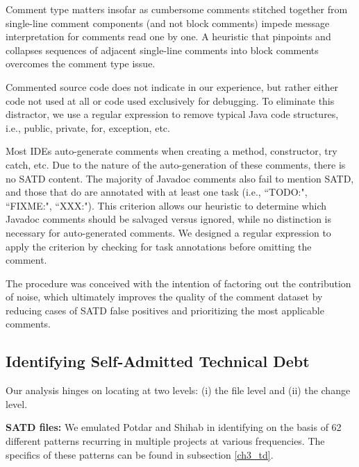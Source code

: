 Comment type matters insofar as cumbersome comments stitched together from single-line comment components (and not block comments) impede message interpretation for comments read one by one. A heuristic that pinpoints and collapses sequences of adjacent single-line comments into block comments overcomes the comment type issue.\par



Commented source code does not indicate \SATD in our experience, but rather either code not used at all or code used exclusively for debugging. To eliminate this distractor, we use a regular expression to remove typical Java code structures, i.e., public, private, for, exception, etc.\par


Most IDEs auto-generate comments when creating a method, constructor, try catch, etc. Due to the nature of the auto-generation of these comments, there is no SATD content. The majority of Javadoc comments also fail to mention SATD, and those that do are annotated with at least one task (i.e., ``TODO:", ``FIXME:", ``XXX:"). This criterion allows our heuristic to determine which Javadoc comments should be salvaged versus ignored, while no distinction is necessary for auto-generated comments. We designed a regular expression to apply the criterion by checking for task annotations before omitting the comment.\par




The procedure was conceived with the intention of factoring out the contribution of noise, which ultimately improves the quality of the comment dataset by reducing cases of SATD false positives and prioritizing the most applicable comments.\par



\subsection{Identifying Self-Admitted Technical Debt}
\label{ch4_td}


Our analysis hinges on locating \SATD at two levels: (i) the file level and (ii) the change level.

\noindent\textbf{SATD files:}
We emulated Potdar and Shihab \cite{ICSM_PotdarS14} in identifying \SATD on the basis of 62 different patterns recurring in multiple projects at various frequencies. The specifics of these patterns can be found in subsection \ref{ch3_td}.


